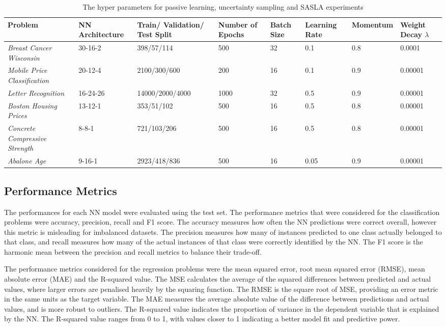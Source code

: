 \documentclass[conference]{IEEEtran}
\begin{document}
	\begin{table}[htbp]
		\centering
		\caption{The hyper parameters for passive learning, uncertainty sampling and SASLA experiments}
		\label{tab:hyperparameters}
		\begin{tabular}{L{3cm}L{1.8cm}L{2.5cm}L{1.5cm}L{1.5cm}L{1.5cm}L{1.5cm}L{1.5cm}}
			\hline
			\textbf{Problem} & \textbf{NN Architecture} & \textbf{Train/ Validation/ Test Split} & \textbf{Number of Epochs} & \textbf{Batch Size} & \textbf{Learning Rate} & \textbf{Momentum} & \textbf{Weight Decay $\lambda$} \\
			\hline
			\textit{Breast Cancer Wisconsin} & 30-16-2 & 398/57/114 & 500 & 32 & 0.1 & 0.8 & 0.0001 \\
			\textit{Mobile Price Classification} & 20-12-4 & 2100/300/600 & 200 & 16 & 0.1 & 0.9 & 0.00001 \\
			\textit{Letter Recognition} & 16-24-26 & 14000/2000/4000 & 1000 & 32 & 0.5 & 0.9 & 0.00001 \\
			\textit{Boston Housing Prices} & 13-12-1 & 353/51/102 & 500 & 16 & 0.5 & 0.8 & 0.00001 \\
			\textit{Concrete Compressive Strength} & 8-8-1 & 721/103/206 & 500 & 16 & 0.5 & 0.8 & 0.00001 \\
			\textit{Abalone Age} & 9-16-1 & 2923/418/836 & 500 & 16 & 0.05 & 0.9 & 0.00001 \\ 
			\hline
		\end{tabular}
	\end{table}
	
	\subsection{Performance Metrics}
	The performances for each NN model were evaluated using the test set. The performance metrics that were considered for the classification problems were accuracy, precision, recall and F1 score. The accuracy measures how often the NN predictions were correct overall, however this metric is misleading for imbalanced datasets. The precision measures how many of instances predicted to one class actually belonged to that class, and recall measures how many of the actual instances of that class were correctly identified by the NN. The F1 score is the harmonic mean between the precision and recall metrics to balance their trade-off.
	
	The performance metrics considered for the regression problems were the mean squared error, root mean squared error (RMSE), mean absolute error (MAE) and the R-squared value. The MSE calculates the average of the squared differences between predicted and actual values, where larger errors are penalised heavily by the squaring function. The RMSE is the square root of MSE, providing an error metric in the same units as the target variable. The MAE measures the average absolute value of the difference between predictions and actual values, and is more robust to outliers. The R-squared value indicates the proportion of variance in the dependent variable that is explained by the NN. The R-squared value ranges from 0 to 1, with values closer to 1 indicating a better model fit and predictive power.
	
\end{document}
